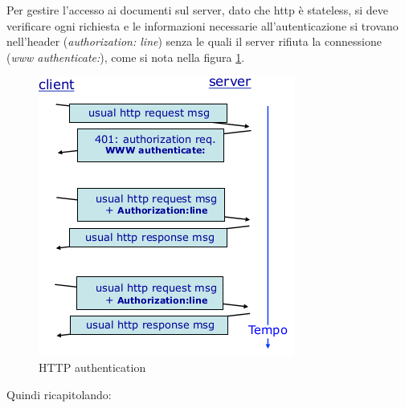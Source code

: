 \documentclass[a4paper,12pt, oneside]{book}
\begin{document}
Per gestire l'accesso ai documenti sul server, dato che http è stateless, si deve verificare ogni richiesta 
e le informazioni necessarie all'autenticazione si trovano nell'header (\textit{authorization: line}) 
senza le quali il server rifiuta la connessione (\textit{www authenticate:}), come si nota 
nella figura \ref{img:authentication}.
\begin{figure}
    \caption{HTTP authentication}
    \label{img:authentication}
	\includegraphics[scale=0.7]{img/http6.png}
\end{figure}
Quindi ricapitolando:
\end{document}
